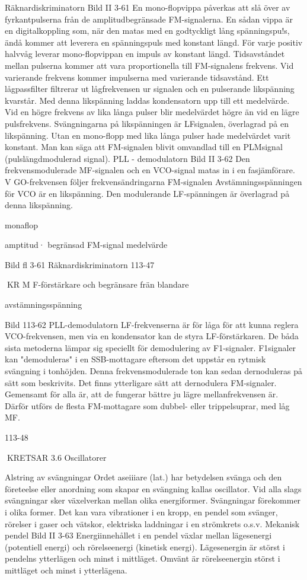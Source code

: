 {{{Räknardiskriminatorn
Bild II 3-61
En mono-flopvippa påverkas att slå över av
fyrkantpulserna från de amplitudbegränsade
FM-signalerna.
En sådan vippa är en digitalkoppling som,
när den matas med en godtyckligt lång spänningspu!s, ändå kommer att leverera en spänningspuls med konstant längd. För varje
positiv halvvåg leverar mono-flopvippan en
impuls av konstant längd. Tidsavståndet
mellan pulserna kommer att vara proportionella till FM-signalens frekvens. Vid varierande frekvens kommer impulserna med
varierande tidsavstånd. Ett lågpassfilter filtrerar ut lågfrekvensen ur signalen och en
pulserande likspänning kvarstår. Med denna likspänning laddas kondensatorn upp till
ett medelvärde. Vid en högre frekvens av
lika långa pulser blir medelvärdet högre än
vid en lägre pulsfrekvens.
Svängningarna på likspänningen är LFsignalen, överlagrad på en likspänning. Utan
en mono-flopp med lika långa pulser hade
medelvärdet varit konstant. Man kan säga
att FM-signalen blivit omvandlad till en PLMsignal (pulslängdmodulerad signal).
PLL - demodulatorn
Bild II 3-62
Den frekvensmodulerade MF-signalen och
en VCO-signal matas in i en fasjämförare.
V GO-frekvensen följer frekvensändringarna
FM-signalen Avstämningsspänningen för
VCO är en likspänning. Den modulerande
LF-spänningen är överlagrad på denna likspänning.

monaflop

amptitud·
begränsad
FM-signal
medelvärde

Bild fl 3-61 Räknardiskriminatorn
113-47

KR
M F-förstärkare
och begränsare
frän blandare

avstämningsspänning

Bild 113-62 PLL-demodulatorn
LF-frekvenserna är för låga för att kunna
reglera VCO-frekvensen, men via en kondensator kan de styra LF-förstärkaren.
De båda sista metoderna lämpar sig speciellt för demodulering av F1-signaler. F1signaler kan "demoduleras" i en SSB-mottagare eftersom det uppstår en rytmisk svängning i tonhöjden. Denna frekvensmodulerade
ton kan sedan dernoduleras på sätt som
beskrivits.
Det finns ytterligare sätt att dernodulera
FM-signaler. Gemensamt för alla är, att de
fungerar bättre ju lägre mellanfrekvensen är.
Därför utförs de flesta FM-mottagare som
dubbel- eller trippelsuprar, med låg MF.

113-48

KRETSAR
3.6 Oscillatorer

Alstring av svängningar
Ordet aseiiiare (lat.) har betydelsen svänga
och den företeelse eller anordning som skapar en svängning kallas oscillator. Vid alla
slags svängningar sker växelverkan mellan
olika energiformer. Svängningar förekommer i olika former. Det kan vara vibrationer i
en kropp, en pendel som svänger, rörelser i
gaser och vätskor, elektriska laddningar i en
strömkrets o.s.v.
Mekanisk pendel
Bild II 3-63
Energiinnehållet i en pendel växlar mellan
lägesenergi (potentiell energi) och rörelseenergi (kinetisk energi). Lägesenergin är
störst i pendelns ytterlägen och minst i mittläget. Omvänt är rörelseenergin störst i mittläget och minst i ytterlägena.

}}}
